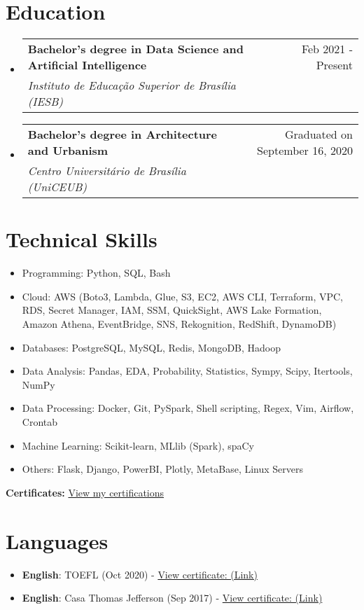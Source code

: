 \documentclass[letterpaper,11pt]{article}%
\makeatletter
\newcommand{\resumeSubheading}[4]{\vspace{-1pt}\item\begin{tabular*}{0.97\textwidth}[t]{l@{\extracolsep{\fill}}r}\textbf{#1} & #2 \\\textit{\small #3} & \textit{\small #4} \\\end{tabular*}\vspace{-8pt}}%
\newcommand{\resumeSubHeadingListStart}{\begin{itemize}[leftmargin=0.15in, label={}, itemsep=0pt, parsep=0pt]}%
\newcommand{\resumeSubHeadingListEnd}{\end{itemize}}%
\newcommand{\resumeItemListStart}{\begin{itemize}[itemsep=0pt, parsep=0pt]}%
\newcommand{\resumeItemListEnd}{\end{itemize}\vspace{-1pt}}%
\makeatother
\begin{document}
%
\section*{Education}%
\label{sec:Education}%
\resumeSubHeadingListStart%
\resumeSubheading{Bachelor’s degree in Data Science and Artificial Intelligence}{Feb 2021 - Present}{Instituto de Educação Superior de Brasília (IESB)}{}%
\resumeSubHeadingListEnd%
\resumeSubHeadingListStart%
\resumeSubheading{Bachelor’s degree in Architecture and Urbanism}{Graduated on September 16, 2020}{Centro Universitário de Brasília (UniCEUB)}{}%
\resumeSubHeadingListEnd

%
\section*{Technical Skills}%
\label{sec:TechnicalSkills}%
\begin{multicols}{2}%
\resumeItemListStart%
\item Programming: Python, SQL, Bash%
\item Cloud: AWS (Boto3, Lambda, Glue, S3, EC2, AWS CLI, Terraform, VPC, RDS, Secret Manager, IAM, SSM, QuickSight, AWS Lake Formation, Amazon Athena, EventBridge, SNS, Rekognition, RedShift, DynamoDB)%
\item Databases: PostgreSQL, MySQL, Redis, MongoDB, Hadoop%
\item Data Analysis: Pandas, EDA, Probability, Statistics, Sympy, Scipy, Itertools, NumPy%
\item Data Processing: Docker, Git, PySpark, Shell scripting, Regex, Vim, Airflow, Crontab%
\item Machine Learning: Scikit-learn, MLlib (Spark), spaCy%
\item Others: Flask, Django, PowerBI, Plotly, MetaBase, Linux Servers%
\resumeItemListEnd%
\end{multicols}%
\vspace{0.5em}

%
\textbf{Certificates:} \href{https://robertomdiniz.s3.amazonaws.com/accomplishments.html}{View my certifications}%
\section*{Languages}%
\label{sec:Languages}%
\begin{itemize}[leftmargin=0.15in, label={}]%
\item%
\textbf{English}: TOEFL (Oct 2020) - \href{https://github.com/s33ding/my_resume/blob/main/my_certificates/english_TOEFL_my_score.pdf}{View certificate: (Link)}%
\item%
\textbf{English}: Casa Thomas Jefferson (Sep 2017) - \href{https://github.com/s33ding/my_resume/blob/main/my_certificates/english_Casa%20Thomas%20Jefferson.pdf}{View certificate: (Link)}%
\end{itemize}

%
\end{document}

